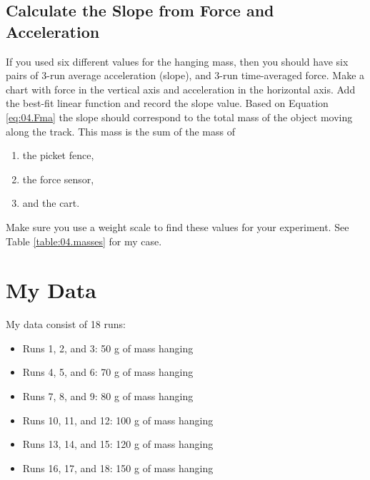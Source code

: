 \subsection{Calculate the Slope from Force and Acceleration}
%
If you used six different values for the hanging mass, then you should have six pairs of 3-run average acceleration (slope), and 3-run time-averaged force. Make a chart with force in the vertical axis and acceleration in the horizontal axis. Add the best-fit linear function and record the slope value. Based on Equation \ref{eq:04.Fma} the slope should correspond to the total mass of the object moving along the track. This mass is the sum of the mass of
\begin{enumerate}
    \item the picket fence,
    \item the force sensor,
    \item and the cart.
\end{enumerate}
Make sure you use a weight scale to find these values for your experiment. See Table \ref{table:04.masses} for my case.
%
\section{My Data}
%
My data consist of 18 runs:
\begin{itemize}
    \item Runs 1, 2, and 3: 50 g of mass hanging
    \item Runs 4, 5, and 6: 70 g of mass hanging
    \item Runs 7, 8, and 9: 80 g of mass hanging
    \item Runs 10, 11, and 12: 100 g of mass hanging
    \item Runs 13, 14, and 15: 120 g of mass hanging
    \item Runs 16, 17, and 18: 150 g of mass hanging
\end{itemize}
%
